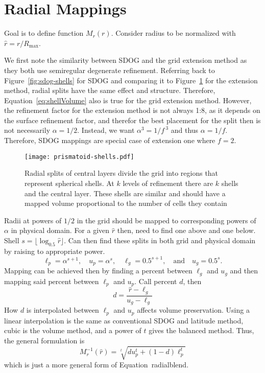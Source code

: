 \section{Radial Mappings} \label{chap:6:radial}
Goal is to define function $M_r(r)$. Consider radius to be normalized with $\hat{r} = r / R_\mathrm{max}$.


We first note the similarity between SDOG and the grid extension method as they both use semiregular degenerate refinement.
Referring back to Figure~\ref{fig:sdog-shells} for SDOG and comparing it to Figure~\ref{fig:prismatoid-shells} for the extension method, radial splits have the same effect and structure.
Therefore, Equation~\ref{eq:shellVolume} also is true for the grid extension method.
However, the refinement factor for the extension method is not always 1:8, as it depends on the surface refinement factor, and therefor the best placement for the split then is not necessarily $\alpha = 1/2$.
Instead, we want $\alpha^3 = 1 / f^{\ 3}$ and thus $\alpha = 1/f$.
Therefore, SDOG mappings are special case of extension one where $f = 2$.

\begin{figure}[ht!]
	\centering
	\texttt{[image: prismatoid-shells.pdf]}
	\caption[Spherical shells that result from the grid extension method]{
		Radial splits of central layers divide the grid into regions that represent spherical shells.
		At $k$ levels of refinement there are $k$ shells and the central layer.
		These shells are similar and should have a mapped volume proportional to the number of cells they contain
	}
	\label{fig:prismatoid-shells}
\end{figure}

Radii at powers of $1/2$ in the grid should be mapped to corresponding powers of $\alpha$ in physical domain.
For a given $\hat{r}$ then, need to find one above and one below.
Shell $s = \lfloor \log_{0.5} \hat{r} \rfloor$.
Can then find these splits in both grid and physical domain by raising to appropriate power.
%
\begin{equation*}
\ell_p = \alpha^{s+1}, \quad u_p = \alpha^s, \quad \ell_g = 0.5^{s + 1}, \quad \text{and} \quad u_g = 0.5^s.
\end{equation*}
%
Mapping can be achieved then by finding a percent between $\ell_g$ and $u_g$ and then mapping said percent between $\ell_p$ and $u_p$.
Call percent $d$, then
%
\begin{equation} \label{eq:radialInvD}
d = \frac{ \hat{r} - \ell_g }{ u_g - \ell_g }
\end{equation}
%
How $d$ is interpolated between $\ell_p$ and $u_p$ affects volume preservation.
Using a linear interpolation is the same as conventional SDOG and latitude method, cubic is the volume method, and a power of $t$ gives the balanced method.
Thus, the general formulation is
%
\begin{equation} \label{eq:radialInv}
M_r^{-1}(\hat{r}) = \sqrt[t]{ d u_p^{t} + \left( 1 - d \right) \ell_p^{t} }
\end{equation}
%
which is just a more general form of Equation~radialblend.


